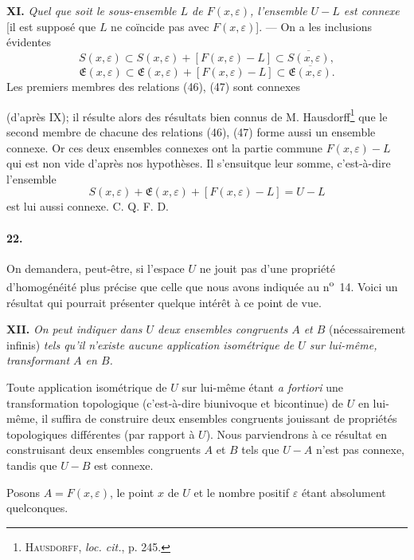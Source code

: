 \documentclass[a4paper,12pt]{amsart}
\newcommand{\srcpage}[1]{} %
\begin{document}
\textbf{XI.} \textit{Quel que soit le sous-ensemble $L$ de $F(x,\varepsilon)$, l'ensemble $U-L$ est connexe} [il est supposé que $L$ ne coïncide pas avec $F(x,\varepsilon)$]. --- On a les inclusions évidentes
\begin{equation}S(x,\varepsilon)\subset S(x,\varepsilon)+[F(x,\varepsilon)-L]\subset\overline{S(x,\varepsilon)},\tag{46}\end{equation}
\begin{equation}\mathfrak{E}(x,\varepsilon)\subset\mathfrak{E}(x,\varepsilon)+[F(x,\varepsilon)-L]\subset\overline{\mathfrak{E}(x,\varepsilon)}.\tag{47}\end{equation}
Les premiers membres des relations (46), (47) sont connexes
\srcpage{87}
(d'après IX); il résulte alors des résultats bien connus de M. Hausdorff\footnote{\textsc{Hausdorff}, \textit{loc. cit.}, p. 245.} que le second membre de chacune des relations (46), (47) forme aussi un ensemble connexe. Or ces deux ensembles connexes ont la partie commune $F(x,\varepsilon)-L$ qui est non vide d'après nos hypothèses. Il s'ensuit\footnotemark[\value{footnote}] que leur somme, c'est-à-dire l'ensemble
\[S(x,\varepsilon)+\mathfrak{E}(x,\varepsilon)+[F(x,\varepsilon)-L]=U-L\]
est lui aussi connexe. \hfill C. Q. F. D.

\paragraph{22.}
On demandera, peut-être, si l'espace $U$ ne jouit pas d'une propriété d'homogénéité plus précise que celle que nous avons indiquée au n\textsuperscript{o}~14. Voici un résultat qui pourrait présenter quelque intérêt à ce point de vue.

\textbf{XII.} \textit{On peut indiquer dans $U$ deux ensembles congruents $A$ et $B$} (nécessairement infinis) \textit{tels qu'il n'existe aucune application isométrique de $U$ sur lui-même, transformant $A$ en $B$.}

Toute application isométrique de $U$ sur lui-même étant \textit{a fortiori} une transformation topologique (c'est-à-dire biunivoque et bicontinue) de $U$ en lui-même, il suffira de construire deux ensembles congruents jouissant de propriétés topologiques différentes (par rapport à $U$). Nous parviendrons à ce résultat en construisant deux ensembles congruents $A$ et $B$ tels que $U-A$ n'est pas connexe, tandis que $U-B$ est connexe.

Posons $A=F(x,\varepsilon)$, le point $x$ de $U$ et le nombre positif $\varepsilon$ étant absolument quelconques.
\end{document}
